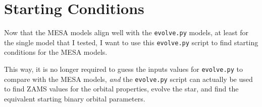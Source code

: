 \documentclass[a4paper,10pt]{article}
\begin{document}
\section{Starting Conditions}
Now that the MESA models align well with the \lstinline[style=output, breaklines=true]|evolve.py| models, at least for the single model that I tested, I want to use this \lstinline[style=output, breaklines=true]|evolve.py| script to find starting conditions for the MESA models.

This way, it is no longer required to guess the inputs values for \lstinline[style=output, breaklines=true]|evolve.py| to compare with the MESA models, \emph{and} the \lstinline[style=output, breaklines=true]|evolve.py| script can actually be used to find ZAMS values for the orbital properties, evolve the star, and find the equivalent starting binary orbital parameters.
\end{document}
